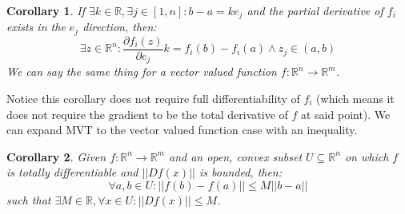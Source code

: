 \documentclass[10pt,letterpaper]{article} %
\newtheorem{cor}{Corollary}[section]
\begin{document}
\begin{cor}
If $\exists k \in \mathbb{R}, \exists j \in [1, n]: b-a = ke_j$ and the partial derivative of $f_i$ exists in the $e_j$ direction, then:
\begin{equation*}
\exists z \in \mathbb{R}^n: \frac{\partial f_i(z)}{\partial e_j}k = f_i(b) - f_i(a) \land z_j \in (a, b)
\end{equation*}
We can say the same thing for a vector valued function $f: \mathbb{R}^n \xrightarrow{} \mathbb{R}^m$.
\end{cor}
Notice this corollary does not require full differentiability of $f_i$ (which means it does not require the gradient to be the total derivative of $f$ at said point). We can expand MVT to the vector valued function case with an inequality.

\begin{cor}
Given $f: \mathbb{R}^n \xrightarrow{} \mathbb{R}^m$ and an open, convex subset $U \subseteq \mathbb{R}^n$ on which $f$ is totally differentiable and $||Df(x)||$ is bounded, then:
\begin{equation*}
\forall a, b \in U: ||f(b) - f(a)|| \leqslant M||b-a||
\end{equation*}
such that $\exists M \in \mathbb{R}, \forall x \in U: ||Df(x)|| \leqslant M$. 
\end{cor}
\end{document}
